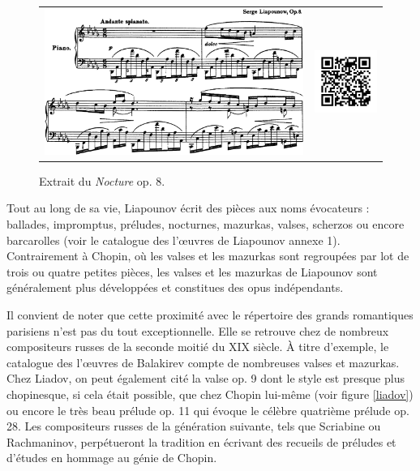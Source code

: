 \begin{figure}[!p]
  \begin{bigcenter}
    \begin{tabular}{lr}
      \includegraphics[width=12.5cm, keepaspectratio]{op8.png}
      &
      \includegraphics[width=3cm, keepaspectratio]{op8-qr.png}
    \end{tabular}
  \end{bigcenter}
  \caption{\label{op3}Extrait du \emph{Nocture} op. 8.}
\end{figure}

\newpage

Tout au long de sa vie, Liapounov écrit des pièces aux noms évocateurs : ballades, impromptus, préludes, nocturnes, mazurkas, valses, scherzos ou encore barcarolles (voir le catalogue des l'œuvres de Liapounov annexe 1). Contrairement à Chopin, où les valses et les mazurkas sont regroupées par lot de trois ou quatre petites pièces, les valses et les mazurkas de Liapounov sont généralement plus développées et constitues des opus indépendants.

Il convient de noter que cette proximité avec le répertoire des grands romantiques parisiens n'est pas du tout exceptionnelle. Elle se retrouve chez de nombreux compositeurs russes de la seconde moitié du XIX\ieme{} siècle. À titre d'exemple, le catalogue des l'œuvres de Balakirev compte de nombreuses valses et mazurkas. Chez Liadov, on peut également cité la valse op. 9  dont le style est presque plus chopinesque, si cela était possible, que chez Chopin lui-même (voir figure \ref{liadov}) ou encore le très beau prélude op. 11  qui évoque le célèbre quatrième prélude op. 28. Les compositeurs russes de la génération suivante, tels que Scriabine ou Rachmaninov, perpétueront la tradition en écrivant des recueils de préludes et d'études en hommage au génie de Chopin.\\

